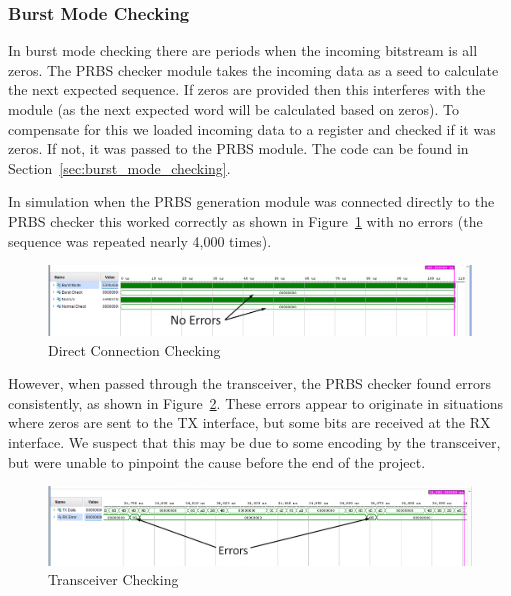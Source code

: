 \subsubsection{Burst Mode Checking}%
\label{ssub:burst_mode_checking}
In burst mode checking there are periods when the incoming bitstream is all
zeros. The PRBS checker module takes the incoming data as a seed to calculate
the next expected sequence. If zeros are provided then this interferes with the
module (as the next expected word will be calculated based on zeros). To
compensate for this we loaded incoming data to a register and checked if it was
zeros. If not, it was passed to the PRBS module.
The code can be found in Section~\ref{sec:burst_mode_checking}.  

In simulation when the PRBS generation module was connected directly to the
PRBS checker this worked correctly as shown in Figure~\ref{fig:burst_check_1}
with no errors (the sequence was repeated nearly 4,000 times). 
\begin{figure}[ht]
    \centering
    \hspace*{-3cm}\includegraphics[width=1.5\linewidth]{img/burst_check.png}
    \caption{Direct Connection Checking}%
    \label{fig:burst_check_1}
\end{figure}

However, when passed through the transceiver, the PRBS checker found errors
consistently, as shown in Figure~\ref{fig:burst_check_2}.  These errors appear
to originate in situations where zeros are sent to the TX interface, but some
bits are received at the RX interface.  We suspect that this may be due to some
encoding by the transceiver, but were unable to pinpoint the cause before the
end of the project.

\begin{figure}[ht]
    \centering
    \hspace*{-3cm}\includegraphics[width=1.5\linewidth]{img/burst_check_2.png}
    \caption{Transceiver Checking}%
    \label{fig:burst_check_2}
\end{figure}

